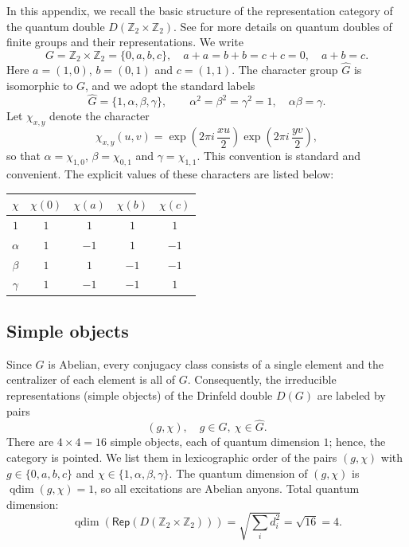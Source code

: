 \documentclass[a4paper,11pt]{article}
\newcommand{\Zbb}{\mathbb{Z}}
\theoremstyle{definition}
\theoremstyle{remark}
\theoremstyle{remark}
\newcommand\Rep {\mathsf{Rep}}
\begin{document}
In this appendix, we recall the basic structure of the representation category of the quantum double $D(\mathbb Z_2\times\mathbb Z_2)$. See \cite{bakalov2001lectures,gould1993quantum} for more details on quantum doubles of finite groups and their representations.
We write
\begin{equation*}
G=\mathbb{Z}_2 \times \mathbb{Z}_2=\{0,a,b,c\},
\quad  
a+a=b+b=c+c=0,\quad a+b=c.
\end{equation*}
Here $a=(1,0)$, $b=(0,1)$ and $c=(1,1)$.
The character group $\widehat{G}$ is isomorphic to $G$, and we adopt the standard labels
\begin{equation*}
\widehat{G}=\{1,\alpha,\beta,\gamma\},
\quad  
\quad 
\alpha^2=\beta^2=\gamma^2=1,\quad \alpha\beta=\gamma.
\end{equation*}
Let $\chi_{x,y}$ denote the character
\begin{equation*}
\chi_{x,y}(u,v)
=\exp\!\left(2\pi i\,\frac{x u}{2}\right)
 \exp\!\left(2\pi i\,\frac{y v}{2}\right),
\end{equation*}
so that $\alpha=\chi_{1,0}$, $\beta=\chi_{0,1}$ and $\gamma=\chi_{1,1}$.
This convention is standard and convenient.
The explicit values of these characters are listed below:
\begin{center}
\begin{tabular}{c|cccc}
\toprule
\(\chi\) & \(\chi(0)\) & \(\chi(a)\) & \(\chi(b)\) & \(\chi(c)\) \\
\midrule
\(1\) & \(1\) & \(1\) & \(1\) & \(1\) \\
\(\alpha\) & \(1\) & \(-1\) & \(1\) & \(-1\) \\
\(\beta\) & \(1\) & \(1\) & \(-1\) & \(-1\) \\
\(\gamma\) & \(1\) & \(-1\) & \(-1\) & \(1\) \\
\bottomrule
\end{tabular}
\end{center}



\subsection*{Simple objects}

Since $G$ is Abelian, every conjugacy class consists of a single element and the centralizer of each element is all of $G$.  
Consequently, the irreducible representations (simple objects) of the Drinfeld double $D(G)$ are labeled by pairs
\begin{equation*}
(g,\chi),\quad  g\in G,\ \chi\in\widehat{G}.
\end{equation*}
There are $4\times 4 = 16$ simple objects, each of quantum dimension $1$; hence, the category is pointed.  
We list them in lexicographic order of the pairs $(g,\chi)$ with $g\in\{0,a,b,c\}$ and $\chi\in\{1,\alpha,\beta,\gamma\}$. The quantum dimension of $(g,\chi)$ is $\operatorname{qdim}(g,\chi)=1$, so all excitations are Abelian anyons.
Total quantum dimension:
  \begin{equation}
      \operatorname{qdim}(\Rep(D(\Zbb_2 \times \Zbb_2))) = \sqrt{\sum_i d_i^2} = \sqrt{16} = 4.
  \end{equation}
\end{document}
